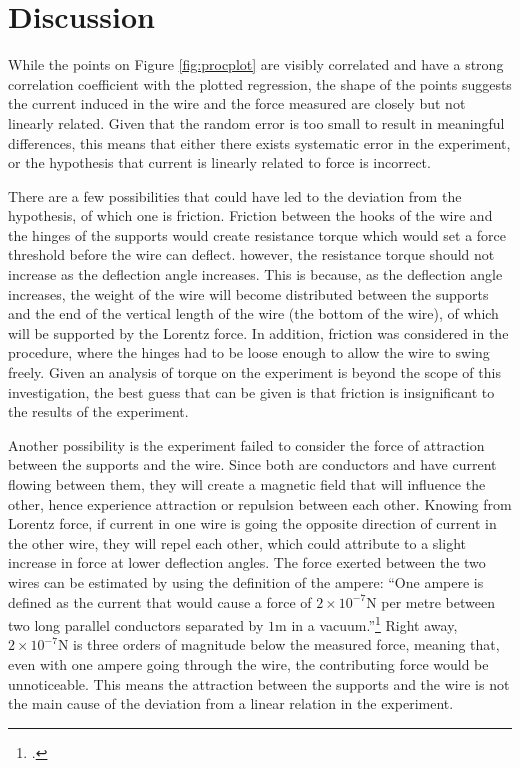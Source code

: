 \section*{Discussion}

While the points on Figure \ref{fig:procplot} are visibly correlated and have a strong correlation coefficient with the plotted regression, the shape of the points suggests the current induced in the wire and the force measured are closely but not linearly related.
Given that the random error is too small to result in meaningful differences, this means that either there exists systematic error in the experiment, or the hypothesis that current is linearly related to force is incorrect.

There are a few possibilities that could have led to the deviation from the hypothesis, of which one is friction.
Friction between the hooks of the wire and the hinges of the supports would create resistance torque which would set a force threshold before the wire can deflect.
however, the resistance torque should not increase as the deflection angle increases.
This is because, as the deflection angle increases, the weight of the wire will become distributed between the supports and the end of the vertical length of the wire (the bottom of the wire), of which will be supported by the Lorentz force.
In addition, friction was considered in the procedure, where the hinges had to be loose enough to allow the wire to swing freely.
Given an analysis of torque on the experiment is beyond the scope of this investigation, the best guess that can be given is that friction is insignificant to the results of the experiment.

Another possibility is the experiment failed to consider the force of attraction between the supports and the wire.
Since both are conductors and have current flowing between them, they will create a magnetic field that will influence the other, hence experience attraction or repulsion between each other.
Knowing from Lorentz force, if current in one wire is going the opposite direction of current in the other wire, they will repel each other, which could attribute to a slight increase in force at lower deflection angles.
The force exerted between the two wires can be estimated by using the definition of the ampere:
``One ampere is defined as the current that would cause a force of $2 \times 10^{-7}\si{\newton}$ per metre between two long parallel conductors separated by $1\si{\meter}$ in a vacuum.''\footcite{pearsonamp}
Right away, $2 \times 10^{-7}\si{\newton}$ is three orders of magnitude below the measured force, meaning that, even with one ampere going through the wire, the contributing force would be unnoticeable.
This means the attraction between the supports and the wire is not the main cause of the deviation from a linear relation in the experiment.

